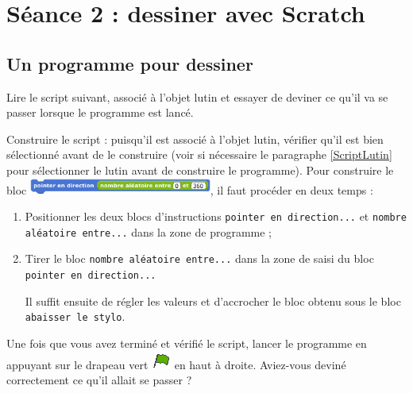 \section{Séance 2 : dessiner avec Scratch}\label{ficheScratch2}


\subsection{Un programme pour dessiner}

Lire le script suivant, associé à l'objet lutin et essayer de deviner ce qu'il va se passer lorsque le programme est lancé.


Construire le script : puisqu'il est associé à l'objet lutin, vérifier qu'il est bien sélectionné avant de le construire (voir si nécessaire le paragraphe \vref{ScriptLutin} pour sélectionner le lutin avant de construire le programme). Pour construire le bloc \includegraphics[width=6cm]{./images/scratch/ScratchActivite23}, il faut procéder en deux temps :

\begin{enumerate}
\item Positionner les deux blocs d'instructions \texttt{pointer en direction...} et \texttt{nombre aléatoire entre...} dans la zone de programme ;


\item Tirer le bloc \texttt{nombre aléatoire entre...} dans la zone de saisi du bloc \texttt{pointer en direction...}


Il suffit ensuite de régler les valeurs et d'accrocher le bloc obtenu sous le bloc \texttt{abaisser le stylo}.
\end{enumerate}



Une fois que vous avez terminé et vérifié le script, lancer le programme en appuyant sur le drapeau vert \includegraphics[width=.7cm]{./images/scratch/DrapeauVert} en haut à droite. Aviez-vous deviné correctement ce qu'il allait se passer ?




